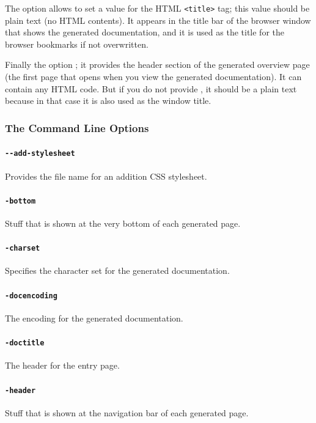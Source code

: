 The option \mbox{} allows to set a value for the HTML \lstinline|<title>| tag; this value should be plain text (no HTML contents). It appears in the title bar of the browser window that shows the generated documentation, and it is used as the title for the browser bookmarks if not overwritten.

Finally the option \mbox{}; it provides the header section of the generated overview page (the first page that opens when you view the generated documentation). It can contain any HTML code. But if you do not provide \mbox{}, it should be a plain text because in that case it is also used as the window title.

\subsubsection{The Command Line Options}

\paragraph{\texttt{-{}-add-stylesheet}} Provides the file name for an addition CSS stylesheet.

\paragraph{\texttt{-bottom}} Stuff that is shown at the very bottom of each generated page.

\paragraph{\texttt{-charset}} Specifies the character set for the generated documentation.

\paragraph{\texttt{-docencoding}} The encoding for the generated documentation.

\paragraph{\texttt{-doctitle}} The header for the entry page.

\paragraph{\texttt{-header}} Stuff that is shown at the navigation bar of each generated page.


